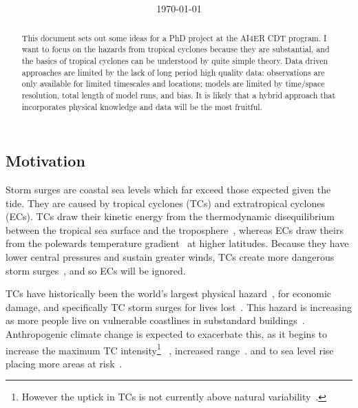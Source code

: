 \documentclass[usenames, dvipsnames]{article}      %
\title{\vspace*{-100pt}\textbf{\mytitle}\vspace{-0pt}}
\date{\today}
\author{\penname}
\begin{document}
\maketitle
\begin{abstract}
    
This document sets out some ideas for a PhD project at the AI4ER CDT program.  I want to focus on the hazards 
from tropical cyclones because they are substantial, 
and the basics of tropical cyclones can be understood by quite simple theory.
Data driven approaches are limited by the 
lack of long period high quality data:
observations are only available for limited
timescales and locations; models are limited by
time/space resolution, total length of model runs, and bias.
It is likely that a hybrid approach that incorporates
physical knowledge and data will be the most fruitful.

\end{abstract}

\subsection*{Motivation}
Storm surges are coastal sea levels which far exceed those
expected given the tide.
They are caused by tropical cyclones
(TCs) and extratropical cyclones (ECs).
TCs draw their kinetic energy from the thermodynamic disequilibrium between
the tropical sea surface and the
troposphere~\cite{emanuel1986air, emanuel1987dependence},
whereas ECs draw theirs from the
polewards temperature
gradient~\cite{lorenz1960energy, holton2004introduction} at higher latitudes.
Because they have lower central pressures and sustain greater winds,
TCs create more dangerous storm surges~\cite{emanuel2005divine},
and so ECs will be ignored.

TCs have historically been the
world's largest physical hazard~\cite{shultz2005epidemiology},
for economic damage,
and specifically TC storm surges for lives lost~\cite{emanuel2005divine,
shultz2005epidemiology, zhang2009tropical}.
This hazard is increasing as more people live on vulnerable coastlines
in substandard buildings~\cite{emanuel2005divine}.
Anthropogenic climate change is expected to exacerbate this,
as it begins to increase the maximum TC intensity\footnote{
However the uptick in TCs is not currently above
 natural variability~\cite{mendelsohn2012impact}.}
~\cite{
emanuel2008hurricanes,emanuel2017will, nordhaus2010},
increased range~\cite{emanuel2008hurricanes, emanuel2017will, fedorov2010tropical}.
and to sea level rise placing more areas at risk~\cite{SROCC}.
\end{document}
